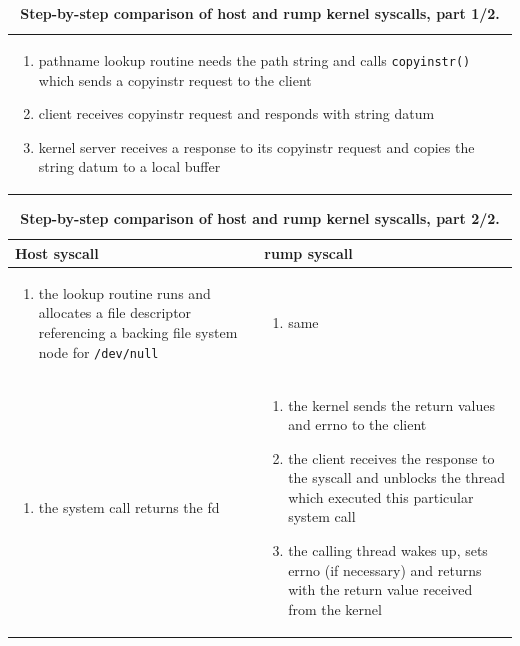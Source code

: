 \begin{table}
{\begin{tabular}{| p{7cm} | p{7cm} |}
\begin{enumerate}[start=5]
\item	pathname lookup routine needs the path string and calls
	\verb+copyinstr()+ which sends a copyinstr request to the client
\item	client receives copyinstr request and responds with string datum
\item   kernel server receives a response to its copyinstr
	request and copies the string datum to a local buffer
\end{enumerate}
\\
\end{tabular}
}
\caption[Step-by-step comparison of host and rump kernel syscalls, part 1/2]{
\textbf{Step-by-step comparison of host and rump kernel syscalls, part 1/2.}}
\label{tab:syscall_comp_1}
\end{table}


\begin{table}
{\small
\begin{tabular}{| p{7cm} | p{7cm} |}
\hline
Host syscall & rump syscall \\
\hline
\hline
\begin{enumerate}[start=5]
\item	the lookup routine runs and allocates a file descriptor
	referencing a backing file system node for \verb+/dev/null+
\end{enumerate}
&

\begin{enumerate}[start=8]
\item   same
\end{enumerate}
\\
\hline

\begin{enumerate}[start=6]
\item   the system call returns the fd
\end{enumerate}
&

\begin{enumerate}[start=9]
\item	the kernel sends the return values and errno to the client
\item   the client receives the response to the syscall and unblocks
	the thread which executed this particular system call
\item   the calling thread wakes up, sets errno (if necessary) and
	returns with the return value received from the kernel
\end{enumerate}
\\
\hline

\end{tabular}
}
\caption[Step-by-step comparison of host and rump kernel syscalls, part 2/2]{
\textbf{Step-by-step comparison of host and rump kernel syscalls, part 2/2.}}
\label{tab:syscall_comp_2}
\end{table}

